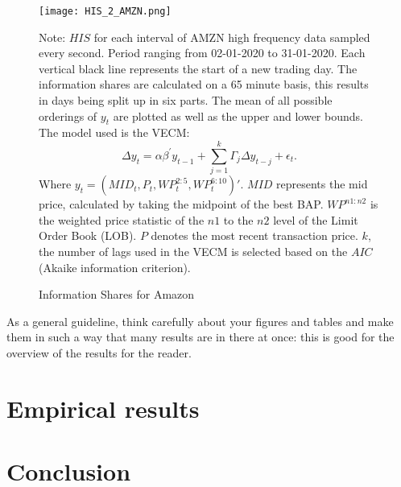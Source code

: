 \documentclass[a4paper,12pt]{article}
\begin{document}
\begin{figure}[!t]
	\centering
	\texttt{[image: HIS\_2\_AMZN.png]}
	\caption{Information Shares for Amazon}
	\begin{minipage}{\columnwidth} \footnotesize
	\vspace{1mm}
	Note: $HIS$ for each interval of AMZN high frequency data sampled every second. Period ranging from 02-01-2020 to 31-01-2020. Each vertical black line represents the start of a new trading day. The information shares are calculated on a 65 minute basis, this results in days being split up in six parts. The mean of all possible orderings of $y_t$ are plotted as well as the upper and lower bounds. The model used is the VECM:
    \[
        \Delta y_t = \alpha \beta^\prime y_{t-1} + \sum_{j=1}^{k}\Gamma_{j}\Delta y_{t-j} + \epsilon_t.
     \]
     Where $y_t = (MID_t, P_t, WP^{2:5}_t, WP^{6:10}_t)'$. $MID$ represents the mid price, calculated by taking the midpoint of the best BAP. $WP^{n1:n2}$ is the weighted price statistic of the $n1$ to the $n2$ level of the Limit Order Book (LOB). $P$ denotes the most recent transaction price. $k$, the number of lags used in the VECM is selected based on the $AIC$ (Akaike information criterion).
     \end{minipage}
     \label{fig:HIS2_AMZN}
\end{figure}


As a general guideline, think carefully about your figures and tables and make them in such a way that many results are in there at once: this is good for the overview of the results for the reader.


\section{Empirical results} \label{s:emp}


\section{Conclusion} \label{s:concl}





\clearpage
\footnotesize
\appendix
\renewcommand{\thesubsection}{\Alph{section}}
\end{document}
